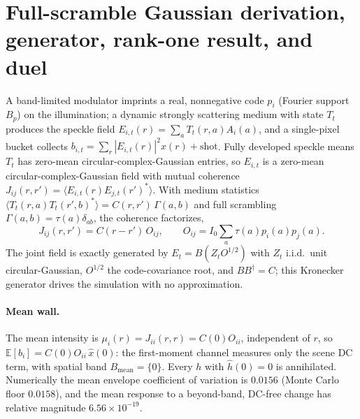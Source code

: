 \documentclass[aps,prl,onecolumn,notitlepage,nofootinbib,superscriptaddress]{revtex4-2}
\begin{document}
\section{Full-scramble Gaussian derivation, generator, rank-one result, and duel}
A band-limited modulator imprints a real, nonnegative code $p_i$ (Fourier
support $B_p$) on the illumination; a dynamic strongly scattering medium with
state $T_t$ produces the speckle field $E_{i,t}(r)=\sum_a T_t(r,a)A_i(a)$, and a
single-pixel bucket collects $b_{i,t}=\sum_r |E_{i,t}(r)|^2 x(r)+\text{shot}$.
Fully developed speckle means $T_t$ has zero-mean circular-complex-Gaussian
entries, so $E_{i,t}$ is a zero-mean circular-complex-Gaussian field with
mutual coherence $J_{ij}(r,r')=\langle E_{i,t}(r)E_{j,t}(r')^{\ast}\rangle$.
With medium statistics
$\langle T_t(r,a)T_t(r',b)^{\ast}\rangle=C(r,r')\,\Gamma(a,b)$ and full
scrambling $\Gamma(a,b)=\tau(a)\delta_{ab}$, the coherence factorizes,
\begin{equation}
J_{ij}(r,r')=C(r-r')\,O_{ij},\qquad
O_{ij}=I_0\sum_a\tau(a)p_i(a)p_j(a).
\label{eq:s_factor}
\end{equation}
The joint field is exactly generated by $E_t=B(Z_t O^{1/2})$ with $Z_t$ i.i.d.\
unit circular-Gaussian, $O^{1/2}$ the code-covariance root, and $BB^{\dagger}=C$;
this Kronecker generator drives the simulation with no approximation.

\paragraph*{Mean wall.}
The mean intensity is $\mu_i(r)=J_{ii}(r,r)=C(0)O_{ii}$, independent of $r$, so
$\mathbb{E}[b_i]=C(0)O_{ii}\,\hat{x}(0)$: the first-moment channel measures only
the scene DC term, with spatial band $B_{\mathrm{mean}}=\{0\}$. Every $h$ with
$\hat{h}(0)=0$ is annihilated. Numerically the mean envelope coefficient of
variation is $0.0156$ (Monte Carlo floor $0.0158$), and the mean response to a
beyond-band, DC-free change has relative magnitude $6.56\times10^{-19}$.
\end{document}
